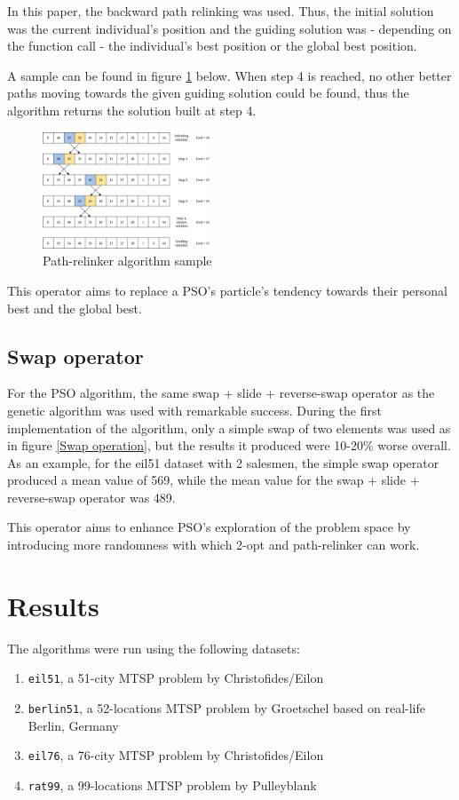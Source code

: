 \documentclass[conference]{IEEEtran}
\begin{document}
In this paper, the backward path relinking was used. Thus, the initial solution was the current individual's position and the
guiding solution was - depending on the function call - the individual's best position or the global best position.

A sample can be found in figure \ref{Path-relinker algorithm sample} below. When step 4 is reached, no other better paths moving
towards the given guiding solution could be found, thus the algorithm returns the solution built at step 4.

\begin{figure}[h]
    \centering
    \includegraphics[width=0.45\textwidth]{images/path-relinker.png}
    \caption{Path-relinker algorithm sample} \label{Path-relinker algorithm sample}
\end{figure}

This operator aims to replace a PSO's particle's tendency towards their personal best and the global best.

\subsection{Swap operator}
For the PSO algorithm, the same swap + slide + reverse-swap operator as the genetic algorithm was used with remarkable success.
During the first implementation of the algorithm, only a simple swap of two elements was used as in figure \ref{Swap operation},
but the results it produced were 10-20\% worse overall. As an example, for the eil51 dataset with 2 salesmen, the simple swap operator
produced a mean value of 569, while the mean value for the swap + slide + reverse-swap operator was 489.

This operator aims to enhance PSO's exploration of the problem space by introducing more randomness with which 2-opt and
path-relinker can work.

\section{Results}
The algorithms were run using the following datasets:
\begin{enumerate}
    \item \texttt{eil51}, a 51-city MTSP problem by Christofides/Eilon
    \item \texttt{berlin51}, a 52-locations MTSP problem by Groetschel based on real-life Berlin, Germany
    \item \texttt{eil76}, a 76-city MTSP problem by Christofides/Eilon
    \item \texttt{rat99}, a 99-locations MTSP problem by Pulleyblank
\end{enumerate}
\end{document}
